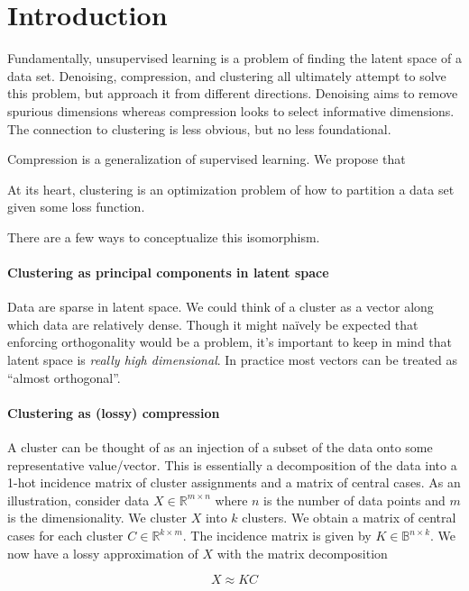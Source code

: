 \section{Introduction}
Fundamentally, unsupervised learning is a problem of finding the latent space of a data set.
Denoising, compression, and clustering all ultimately attempt to solve this problem, but approach it from different directions.
Denoising aims to remove spurious dimensions whereas compression looks to select informative dimensions.
The connection to clustering is less obvious, but no less foundational\cite{9830658}.

Compression is a generalization of supervised learning. 
We propose that 

At its heart, clustering is an optimization problem of how to partition a data set given some loss function.

There are a few ways to conceptualize this isomorphism.

\paragraph{Clustering as principal components in latent space}
Data are sparse in latent space.
We could think of a cluster as a vector along which data are relatively dense.
Though it might na\"ively be expected that enforcing orthogonality would be a problem,  
it's important to keep in mind that latent space is \textit{really high dimensional}.
In practice most vectors can be treated as ``almost orthogonal''.

\paragraph{Clustering as (lossy) compression}
A cluster can be thought of as an injection of a subset of the data onto some representative value/vector.
This is essentially a decomposition of the data into a 1-hot incidence matrix of cluster assignments and a matrix of central cases.
As an illustration, consider data $X \in \mathbb{R}^{m \times n}$ where $n$ is the number of data points and $m$ is the dimensionality.
We cluster $X$ into $k$ clusters.
We obtain a matrix of central cases for each cluster $C \in \mathbb{R}^{k \times m}$.
The incidence matrix is given by $K \in \mathbb{B}^{n \times k}$.
We now have a lossy approximation of $X$ with the matrix decomposition

\begin{equation}
  X \approx KC
\end{equation}

